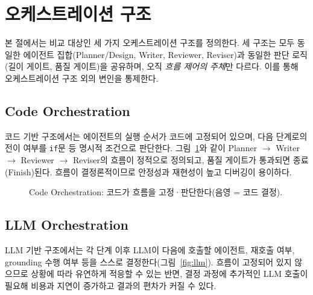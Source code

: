\section{오케스트레이션 구조}

본 절에서는 비교 대상인 세 가지 오케스트레이션 구조를 정의한다. 세 구조는
모두 동일한 에이전트 집합(Planner/Design, Writer, Reviewer, Reviser)과
동일한 판단 로직(길이 게이트, 품질 게이트)을 공유하며, 오직 \emph{흐름
제어의 주체}만 다르다. 이를 통해 오케스트레이션 구조 외의 변인을 통제한다.

\subsection{Code Orchestration}

코드 기반 구조에서는 에이전트의 실행 순서가 코드에 고정되어 있으며,
다음 단계로의 전이 여부를 \texttt{if}문 등 명시적 조건으로 판단한다.
그림~\ref{fig:code}와 같이 Planner $\rightarrow$ Writer $\rightarrow$
Reviewer $\rightarrow$ Reviser의 흐름이 정적으로 정의되고, 품질 게이트가
통과되면 종료(Finish)된다. 흐름이 결정론적이므로 안정성과 재현성이 높고
디버깅이 용이하다.

\begin{figure}[t]
\centering
{}
\caption{Code Orchestration: 코드가 흐름을 고정·판단한다(음영 = 코드 결정).}
\label{fig:code}
\end{figure}

\subsection{LLM Orchestration}

LLM 기반 구조에서는 각 단계 이후 LLM이 다음에 호출할 에이전트, 재호출
여부, grounding 수행 여부 등을 스스로 결정한다(그림~\ref{fig:llm}). 흐름이
고정되어 있지 않으므로 상황에 따라 유연하게 적응할 수 있는 반면, 결정
과정에 추가적인 LLM 호출이 필요해 비용과 지연이 증가하고 결과의 편차가
커질 수 있다.

